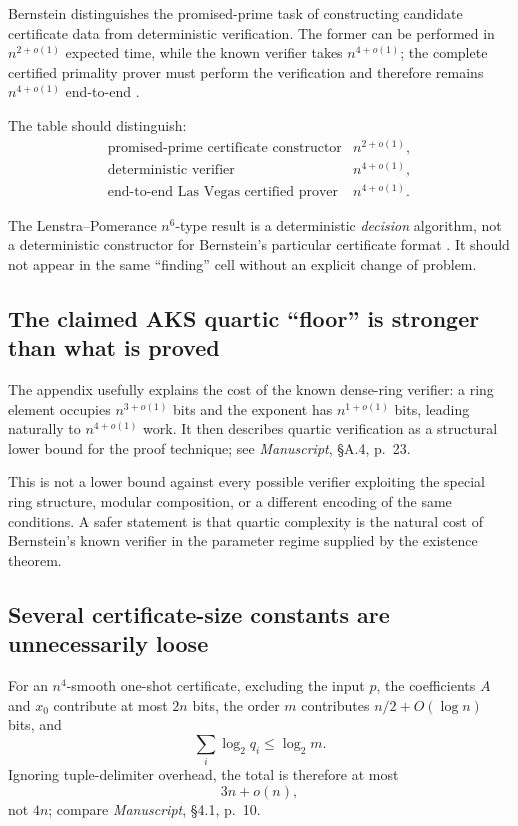 \documentclass[11pt]{amsart}
\newcommand{\sourceat}[2]{\emph{Manuscript}, \S#1, p.~#2}
\begin{document}
Bernstein distinguishes the promised-prime task of constructing candidate certificate data from deterministic verification.  The former can be performed in $n^{2+o(1)}$ expected time, while the known verifier takes $n^{4+o(1)}$; the complete certified primality prover must perform the verification and therefore remains $n^{4+o(1)}$ end-to-end \cite{Bernstein2007,BernsteinWeb}.

The table should distinguish:
\[
\begin{array}{ll}
\text{promised-prime certificate constructor} & n^{2+o(1)},\\
\text{deterministic verifier} & n^{4+o(1)},\\
\text{end-to-end Las Vegas certified prover} & n^{4+o(1)}.
\end{array}
\]

The Lenstra--Pomerance $n^6$-type result is a deterministic \emph{decision} algorithm, not a deterministic constructor for Bernstein's particular certificate format \cite{LenstraPomerance2019}.  It should not appear in the same ``finding'' cell without an explicit change of problem.

\subsection{The claimed AKS quartic ``floor'' is stronger than what is proved}

The appendix usefully explains the cost of the known dense-ring verifier: a ring element occupies $n^{3+o(1)}$ bits and the exponent has $n^{1+o(1)}$ bits, leading naturally to $n^{4+o(1)}$ work.  It then describes quartic verification as a structural lower bound for the proof technique; see \sourceat{A.4}{23}.

This is not a lower bound against every possible verifier exploiting the special ring structure, modular composition, or a different encoding of the same conditions.  A safer statement is that quartic complexity is the natural cost of Bernstein's known verifier in the parameter regime supplied by the existence theorem.

\subsection{Several certificate-size constants are unnecessarily loose}

For an $n^4$-smooth one-shot certificate, excluding the input $p$, the coefficients $A$ and $x_0$ contribute at most $2n$ bits, the order $m$ contributes $n/2+O(\log n)$ bits, and
\[
 \sum_i \log_2 q_i \le \log_2 m.
\]
Ignoring tuple-delimiter overhead, the total is therefore at most
\[
 3n+o(n),
\]
not $4n$; compare \sourceat{4.1}{10}.
\end{document}
